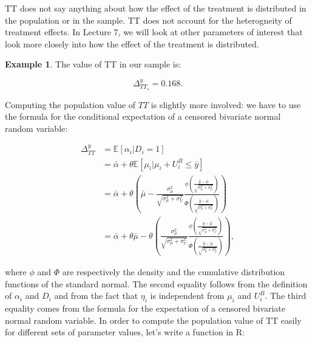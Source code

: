 \documentclass[
]{book}
\newcommand{\esp}[1]{\mathbb{E}[ #1 ]}
\theoremstyle{definition}
\theoremstyle{definition}
\newtheorem{example}{Example}[chapter]
\theoremstyle{definition}
\theoremstyle{definition}
\theoremstyle{remark}
\begin{document}
TT does not say anything about how the effect of the treatment is distributed in the population or in the sample.
TT does not account for the heterogneity of treatment effects.
In Lecture 7, we will look at other parameters of interest that look more closely into how the effect of the treatment is distributed.

\begin{example}
\protect\hypertarget{exm:unnamed-chunk-9}{}{\label{exm:unnamed-chunk-9} }The value of TT in our sample is:
\end{example}
\[
\Delta^y_{TT_s}=0.168.
\]

Computing the population value of \(TT\) is slightly more involved: we have to use the formula for the conditional expectation of a censored bivariate normal random variable:

\begin{align*}
\Delta^y_{TT} & = \esp{\alpha_i|D_i=1}\\
              & = \bar{\alpha}+\theta\esp{\mu_i|\mu_i+U_i^B\leq\bar{y}}\\
              & = \bar{\alpha}+\theta\left(\bar{\mu} - \frac{\sigma^2_{\mu}}{\sqrt{\sigma^2_{\mu}+\sigma^2_{U}}}\frac{\phi\left(\frac{\bar{y}-\bar{\mu}}{\sqrt{\sigma^2_{\mu}+\sigma^2_{U}}}\right)}{\Phi\left(\frac{\bar{y}-\bar{\mu}}{\sqrt{\sigma^2_{\mu}+\sigma^2_{U}}}\right)}\right)\\
              & = \bar{\alpha}+\theta\bar{\mu}-\theta\left(\frac{\sigma^2_{\mu}}{\sqrt{\sigma^2_{\mu}+\sigma^2_{U}}}\frac{\phi\left(\frac{\bar{y}-\bar{\mu}}{\sqrt{\sigma^2_{\mu}+\sigma^2_{U}}}\right)}{\Phi\left(\frac{\bar{y}-\bar{\mu}}{\sqrt{\sigma^2_{\mu}+\sigma^2_{U}}}\right)}\right),
\end{align*}

where \(\phi\) and \(\Phi\) are respectively the density and the cumulative distribution functions of the standard normal.
The second equality follows from the definition of \(\alpha_i\) and \(D_i\) and from the fact that \(\eta_i\) is independent from \(\mu_i\) and \(U_i^B\).
The third equality comes from the formula for the expectation of a censored bivariate normal random variable.
In order to compute the population value of TT easily for different sets of parameter values, let's write a function in R:
\end{document}
